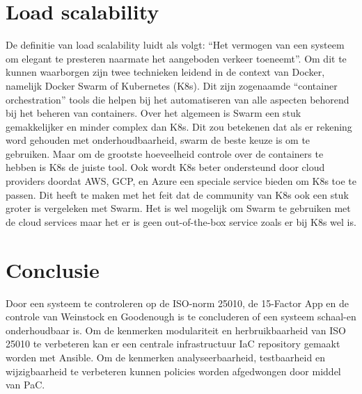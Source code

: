 \section{Load scalability}

De definitie van load scalability luidt als volgt: \enquote{Het vermogen van een systeem om elegant te presteren naarmate het aangeboden verkeer toeneemt}. Om dit te kunnen waarborgen zijn twee technieken leidend in de context van Docker, namelijk Docker Swarm of Kubernetes (K8s). Dit zijn zogenaamde \enquote{container orchestration} tools die helpen bij het automatiseren van alle aspecten behorend bij het beheren van containers. Over het algemeen is Swarm een stuk gemakkelijker en minder complex dan K8s. Dit zou betekenen dat als er rekening word gehouden met onderhoudbaarheid, swarm de beste keuze is om te gebruiken. Maar om de grootste hoeveelheid controle over de containers te hebben is K8s de juiste tool. Ook wordt K8s beter ondersteund door cloud providers doordat AWS, GCP, en Azure een speciale service bieden om K8s toe te passen. Dit heeft te maken met het feit dat de community van K8s ook een stuk groter is vergeleken met Swarm. Het is wel mogelijk om Swarm te gebruiken met de cloud services maar het er is geen out-of-the-box service zoals er bij K8s wel is.
 
\section{Conclusie}

Door een systeem te controleren op de ISO-norm 25010, de 15-Factor App en de controle van Weinstock en Goodenough is te concluderen of een systeem schaal-en onderhoudbaar is. Om de kenmerken modulariteit en herbruikbaarheid van ISO 25010 te verbeteren kan er een centrale infrastructuur IaC repository gemaakt worden met Ansible. Om de kenmerken analyseerbaarheid, testbaarheid en wijzigbaarheid te verbeteren kunnen policies worden afgedwongen door middel van PaC.